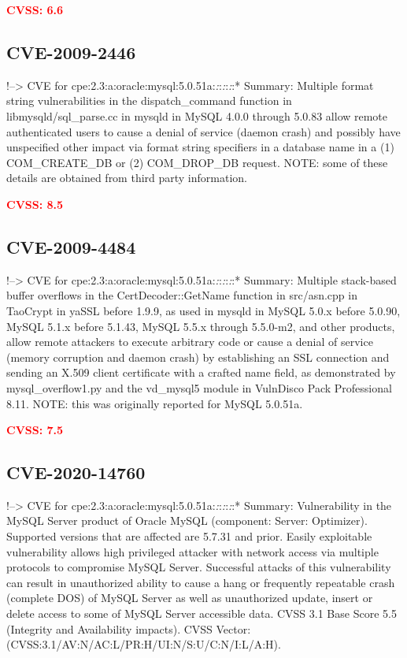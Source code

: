 \documentclass[a4paper, 12pt]{article}
\begin{document}
\textbf{\textcolor{red}{CVSS: 6.6}}

\hypertarget{cve-2009-2446}{%
\subsection{CVE-2009-2446}\label{cve-2009-2446}}

!--\textgreater{} CVE for
cpe:2.3:a:oracle:mysql:5.0.51a:\emph{:}:\emph{:}:\emph{:}:* Summary:
Multiple format string vulnerabilities in the dispatch\_command function
in libmysqld/sql\_parse.cc in mysqld in MySQL 4.0.0 through 5.0.83 allow
remote authenticated users to cause a denial of service (daemon crash)
and possibly have unspecified other impact via format string specifiers
in a database name in a (1) COM\_CREATE\_DB or (2) COM\_DROP\_DB
request. NOTE: some of these details are obtained from third party
information.

\textbf{\textcolor{red}{CVSS: 8.5}}

\hypertarget{cve-2009-4484}{%
\subsection{CVE-2009-4484}\label{cve-2009-4484}}

!--\textgreater{} CVE for
cpe:2.3:a:oracle:mysql:5.0.51a:\emph{:}:\emph{:}:\emph{:}:* Summary:
Multiple stack-based buffer overflows in the CertDecoder::GetName
function in src/asn.cpp in TaoCrypt in yaSSL before 1.9.9, as used in
mysqld in MySQL 5.0.x before 5.0.90, MySQL 5.1.x before 5.1.43, MySQL
5.5.x through 5.5.0-m2, and other products, allow remote attackers to
execute arbitrary code or cause a denial of service (memory corruption
and daemon crash) by establishing an SSL connection and sending an X.509
client certificate with a crafted name field, as demonstrated by
mysql\_overflow1.py and the vd\_mysql5 module in VulnDisco Pack
Professional 8.11. NOTE: this was originally reported for MySQL 5.0.51a.

\textbf{\textcolor{red}{CVSS: 7.5}}

\hypertarget{cve-2020-14760}{%
\subsection{CVE-2020-14760}\label{cve-2020-14760}}

!--\textgreater{} CVE for
cpe:2.3:a:oracle:mysql:5.0.51a:\emph{:}:\emph{:}:\emph{:}:* Summary:
Vulnerability in the MySQL Server product of Oracle MySQL (component:
Server: Optimizer). Supported versions that are affected are 5.7.31 and
prior. Easily exploitable vulnerability allows high privileged attacker
with network access via multiple protocols to compromise MySQL Server.
Successful attacks of this vulnerability can result in unauthorized
ability to cause a hang or frequently repeatable crash (complete DOS) of
MySQL Server as well as unauthorized update, insert or delete access to
some of MySQL Server accessible data. CVSS 3.1 Base Score 5.5 (Integrity
and Availability impacts). CVSS Vector:
(CVSS:3.1/AV:N/AC:L/PR:H/UI:N/S:U/C:N/I:L/A:H).
\end{document}
